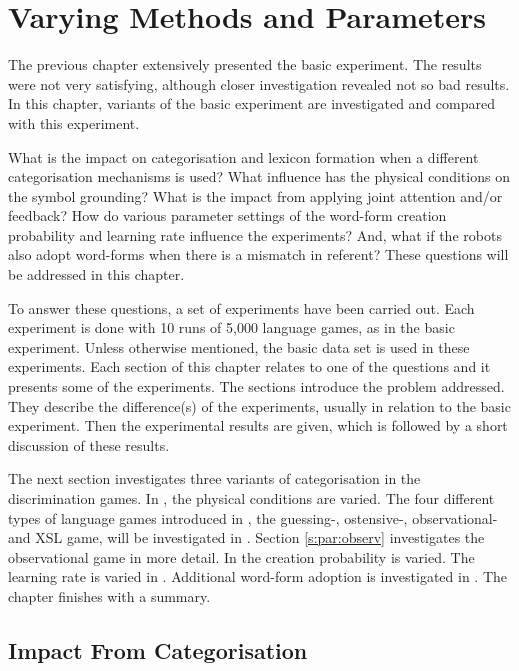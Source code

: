 \chapter{Varying Methods and Parameters}\label{ch:lex}\label{ch:cat}\label{ch:interaction}\label{ch:feedback}\label{ch:par}

The previous chapter extensively presented the basic experiment. The results were not very satisfying, although closer investigation revealed not so bad results. In this chapter, variants of the basic experiment are investigated and compared with this experiment.

What is the impact on categorisation and lexicon formation when a different categorisation mechanisms is used? What influence has the physical conditions on the symbol grounding? What is the impact from applying joint attention and/or feedback? How do various parameter settings of the word-form creation probability and learning rate influence the experiments? And, what if the robots also adopt word-forms when there is a mismatch in referent? These questions will be addressed in this chapter.

To answer these questions, a set of experiments have been carried out. Each experiment is done with 10 runs of 5,000 language games, as in the basic experiment. Unless otherwise mentioned, the basic data set is used in these experiments. Each section of this chapter relates to one of the questions and it presents some of the experiments. The sections introduce the problem addressed. They describe the difference(s) of the experiments, usually in relation to the basic experiment. Then the experimental results are given, which is followed by a short discussion of these results.


The next section investigates three variants of categorisation in the discrimination games. In , the physical conditions are varied. The four different types of language games introduced in , the guessing-, ostensive-, observational- and XSL game, will be investigated in . Section \ref{s:par:observ} investigates the observational game in more detail. In  the creation probability is varied. The learning rate is varied in . Additional word-form adoption is investigated in . The chapter finishes with a summary.

\section{Impact From Categorisation}\label{s:par:cat}

